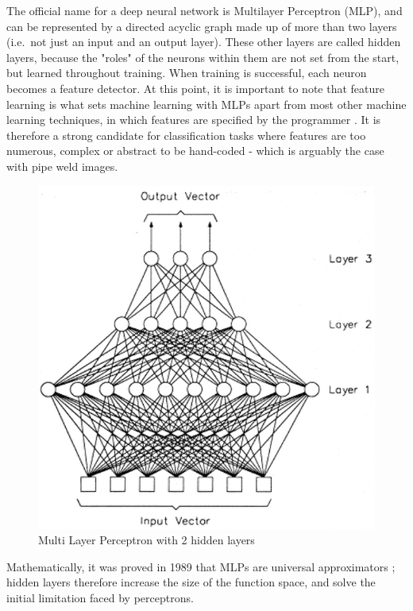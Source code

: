 \documentclass[a4paper,11pt]{article}
\begin{document}
The official name for a deep neural network is Multilayer Perceptron (MLP), and can be represented by a directed acyclic graph made up of more than two layers (i.e.\ not just an input and an output layer). These other layers are called hidden layers, because the "roles" of the neurons within them are not set from the start, but learned throughout training. When training is successful, each neuron becomes a feature detector. At this point, it is important to note that feature learning is what sets machine learning with MLPs apart from most other machine learning techniques, in which features are specified by the programmer \cite{DL-book}. It is therefore a strong candidate for classification tasks where features are too numerous, complex or abstract to be hand-coded - which is arguably the case with pipe weld images.\\ 

\begin{figure}[h!]
	\centering
	\includegraphics[scale=0.4]{images/MLP.png}
	\caption{Multi Layer Perceptron with 2 hidden layers}
\end{figure}

Mathematically, it was proved in 1989 that MLPs are universal approximators \cite{MLP-univ-approx}; hidden layers therefore increase the size of the function space, and solve the initial limitation faced by perceptrons. \\
\end{document}

